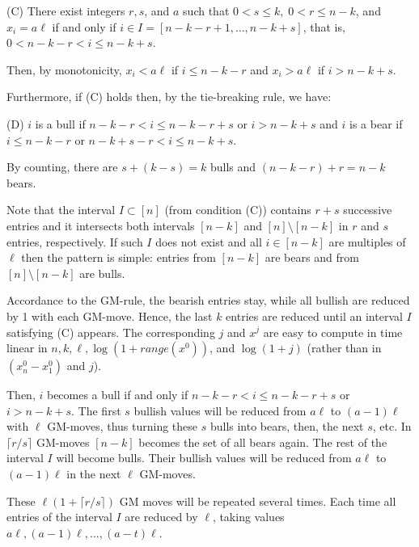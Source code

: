 \documentclass[10pt]{article}
\theoremstyle{definition}
\begin{document}
\medskip 

(C)    
There exist integers $r, s$, and $a$  such that 
$0 < s \leq k, \; 0 < r \leq n-k$, and 
$x_i = a \ell$  if and only if 
$i \in I = [n-k-r+1, \dots, n-k+s]$, 
that is, $0 < n-k-r < i \leq n-k+s$. 

Then, by monotonicity, 
$x_i < a \ell$  if  $i \leq n-k-r$  and 
$x_i > a \ell$  if  $i > n-k+s$. 

\medskip 

Furthermore, if (C) holds then, by the tie-breaking rule, we have: 

\medskip 

(D) 
$i$  is a bull if  
$n-k-r < i \leq  n-k-r+s$  or $i > n-k+s$  and 
$i$  is a bear if  
$i \leq  n-k-r$  or  $n-k+s-r < i \leq  n-k+s$.

\medskip 

By counting,  
there are  $s + (k-s) = k$  bulls and 
$(n-k-r) + r = n-k$  bears. 

\medskip 

Note that the interval $I \subset [n]$ 
(from condition (C))  
contains $r+s$ successive entries 
and it intersects both intervals 
$[n-k]$  and  $[n] \setminus [n-k]$  
in  $r$  and  $s$  entries, respectively. 
If such $I$ does not exist and 
all $i \in [n-k]$  are multiples of $\ell$ 
then the pattern is simple:  
entries from $[n-k]$  are bears and 
from $[n] \setminus [n-k]$  are bulls.

Accordance to the GM-rule,  
the bearish entries stay, while 
all bullish are reduced by 1 
with each  GM-move.
Hence, the last $k$  entries 
are reduced until an interval  $I$  
satisfying  (C)  appears. 
The corresponding $j$  and $x^j$  
are easy to compute in time linear in 
$n,k,\ell, \log(1 + range(x^0))$, and $\log (1+j)$  
(rather than in $(x^0_n - x^0_1)$ and $j$).  

Then, $i$  becomes a bull if and only if   
$n-k-r < i \leq  n-k-r+s$  or $i > n-k+s$.  
The first $s$  bullish values    
will be reduced 
from $a \ell$  to $(a-1) \ell$ with $\ell$ GM-moves, 
thus turning these $s$ bulls into bears, then, the next  $s$, etc. 
In $\lceil r/s \rceil$  GM-moves 
$[n-k]$  becomes the set of all bears again. The rest of the interval $I$ will become bulls. 
Their bullish values will be reduced 
from $a \ell$ to $(a-1) \ell$ in the next $\ell$  GM-moves. 

These $\ell (1 + \lceil r/s \rceil)$ 
GM moves will be repeated several times. 
Each time all entries of the interval  $I$ 
are reduced by  $\ell$,  
taking values  $a \ell, (a-1) \ell, \ldots, (a-t) \ell$. 
\end{document}

